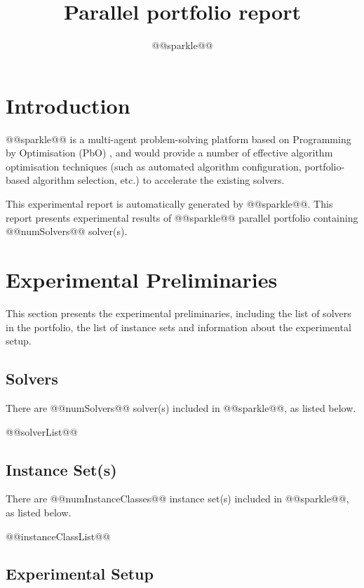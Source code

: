 \documentclass[british]{article}
\title{ Parallel portfolio report}
\author{ @@sparkle@@ }
\begin{document}
\maketitle %


\section{Introduction}
\label{sec:Introduction}

@@sparkle@@ \cite{Hoos15} is a multi-agent problem-solving platform based on Programming by Optimisation (PbO) \cite{Hoos12}, and would provide a number of effective algorithm optimisation techniques (such as automated algorithm configuration, portfolio-based algorithm selection, etc.) to accelerate the existing solvers.

This experimental report is automatically generated by @@sparkle@@. This report presents experimental results of @@sparkle@@ parallel portfolio containing @@numSolvers@@ solver(s).

\section{Experimental Preliminaries}
\label{sec:Experimental_Preliminaries}

This section presents the experimental preliminaries, including the list of solvers in the portfolio, the list of instance sets and information about the experimental setup.

\subsection{Solvers}
\label{sec:Solvers}
There are @@numSolvers@@ solver(s) included in @@sparkle@@, as listed below.

\begin{enumerate}[nolistsep] 
@@solverList@@
\end{enumerate}

\subsection{Instance Set(s)}
\label{sec:Instance_Sets}
There are @@numInstanceClasses@@ instance set(s) included in @@sparkle@@, as listed below.

\begin{enumerate}
@@instanceClassList@@
\end{enumerate}

\subsection{Experimental Setup}
\label{sec:Experimental_Setup}
\end{document}
